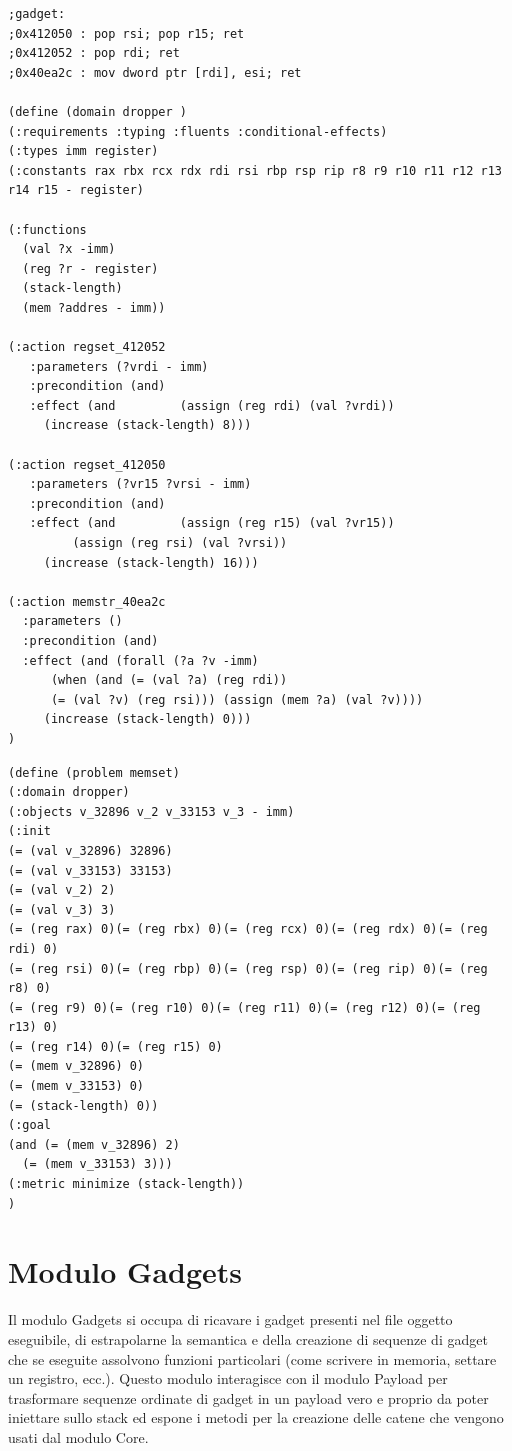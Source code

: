 \begin{lstlisting}[caption=Descrizione del dominio relativo ad un 
    piccolo sottoinsieme dei gadget presenti in ls,label=pddl:domain]
;gadget: 
;0x412050 : pop rsi; pop r15; ret
;0x412052 : pop rdi; ret
;0x40ea2c : mov dword ptr [rdi], esi; ret

(define (domain dropper )
(:requirements :typing :fluents :conditional-effects)
(:types imm register)
(:constants rax rbx rcx rdx rdi rsi rbp rsp rip r8 r9 r10 r11 r12 r13 r14 r15 - register)

(:functions 
  (val ?x -imm)
  (reg ?r - register)
  (stack-length)
  (mem ?addres - imm))

(:action regset_412052
   :parameters (?vrdi - imm)
   :precondition (and)
   :effect (and         (assign (reg rdi) (val ?vrdi))
     (increase (stack-length) 8)))

(:action regset_412050
   :parameters (?vr15 ?vrsi - imm)
   :precondition (and)
   :effect (and         (assign (reg r15) (val ?vr15))
         (assign (reg rsi) (val ?vrsi))
     (increase (stack-length) 16)))

(:action memstr_40ea2c
  :parameters ()
  :precondition (and)
  :effect (and (forall (?a ?v -imm) 
      (when (and (= (val ?a) (reg rdi))
      (= (val ?v) (reg rsi))) (assign (mem ?a) (val ?v))))
     (increase (stack-length) 0)))
)
\end{lstlisting}



\begin{lstlisting}[caption=Descrizione del dominio relativo ad
    un'istanza del problema,label=pddl:facts]
(define (problem memset)
(:domain dropper)
(:objects v_32896 v_2 v_33153 v_3 - imm)
(:init
(= (val v_32896) 32896)
(= (val v_33153) 33153)
(= (val v_2) 2)
(= (val v_3) 3)
(= (reg rax) 0)(= (reg rbx) 0)(= (reg rcx) 0)(= (reg rdx) 0)(= (reg rdi) 0)
(= (reg rsi) 0)(= (reg rbp) 0)(= (reg rsp) 0)(= (reg rip) 0)(= (reg r8) 0)
(= (reg r9) 0)(= (reg r10) 0)(= (reg r11) 0)(= (reg r12) 0)(= (reg r13) 0)
(= (reg r14) 0)(= (reg r15) 0)
(= (mem v_32896) 0)
(= (mem v_33153) 0)
(= (stack-length) 0))
(:goal 
(and (= (mem v_32896) 2)
  (= (mem v_33153) 3)))
(:metric minimize (stack-length))
)
\end{lstlisting}


\section{Modulo Gadgets}

Il modulo Gadgets si occupa di ricavare i gadget presenti nel file
oggetto eseguibile, di estrapolarne la semantica e della creazione di
sequenze di gadget che se eseguite assolvono funzioni particolari
(come scrivere in memoria, settare un registro, ecc.). Questo modulo
interagisce con il modulo Payload per trasformare sequenze ordinate di
gadget in un payload vero e proprio da poter iniettare sullo stack ed
espone i metodi per la creazione delle catene che vengono usati dal
modulo Core.


